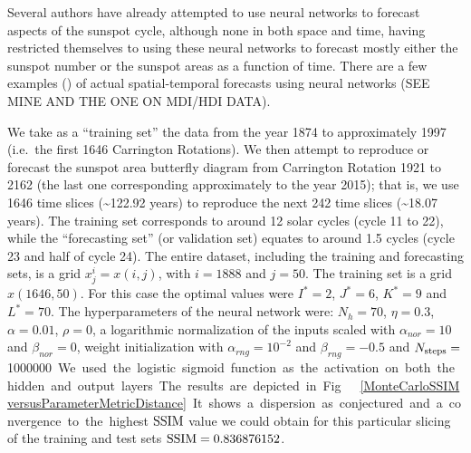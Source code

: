 \documentclass[journal]{IEEEtran}
\begin{document}
Several authors \cite{
1990EOSTr..71..677K,
1991PhDT.......158W,
Weigend92HubermanRumelhart,
1993AdSpR..13..447M,
1995JGR...10021735M,
1994VA.....38..351C,
0305-4470-28-12-012,
1995ApJ...444..916C,
Koskela96timeseries,
1996SoPh..168..423F,
1996AnGeo..14...20F,
1996ITNN....7..501P,
1998GeoRL..25..457K,
1998JGR...10329733C,
1998NewAR..42..343C,
Verdes2000,
2004SoPh..221..167V,
2001GMS...125..201L,
2002PhRvE..66f6701S,
2004SoPh..224..247M,
2005JASTP..67..595G,
2004SPIE.5497..542A ,
2005MmSAI..76.1030Q,
2005SoPh..227..177A,
2006JASTP..68.2061M,
2007SoPh..243..253Q ,
2013Ap&SS.344....5A,
xie2006hybrid,
2006SunGe...1a...8M,
2007IJMPC..18.1839E,
1997SPIE.3077..116P,
2006AGUFMSH21A0315L,
2008cosp...37.3467W,
gang2007sunspot,
2009JASTP..71..569U,
2010BAAA...53..241F,
1999BAAA...43...23P,
2011RAA....11..491A,
2010cosp...38.2153A,
2011CRGeo.343..433C,
JiangS11,
2012cosp...39.1194M,
Chandra:2012:CCE:2181341.2181747,
park2009prediction ,
kim2010sunspot,
moghaddam2013sunspot,
2012EPJP..127...43C,
liu2012sunspot,
Gkana201579,
DBLP:conf/ijcnn/ParsapoorBS15,
DBLP:conf/aaai/ParsapoorBS15,
raios
} have already attempted to use neural networks to forecast aspects of the sunspot cycle, although none in both space and time, having 
restricted themselves to using these neural networks to forecast mostly either the sunspot number or the sunspot areas as a function of 
time.  There are a few examples (\cite{covaspeixinhojoao}) of actual spatial-temporal forecasts using neural networks (SEE MINE AND THE ONE ON 
MDI/HDI DATA).

We take as a ``training set'' the data from the year 1874 to 
approximately 1997 (i.e.\ the first 1646 Carrington Rotations). We then attempt to reproduce or forecast the sunspot area butterfly 
diagram from Carrington Rotation 1921 to 2162 (the last one corresponding approximately to the year 2015); that is, we use 1646 time 
slices (\textasciitilde  122.92 years) to reproduce the next 242 time slices (\textasciitilde  18.07 years). The training set 
corresponds to around 12 solar cycles (cycle 11 to 22), while the ``forecasting set'' (or validation set) equates to around 1.5 cycles 
(cycle 23 and half of cycle 24). The entire dataset, including the training and forecasting sets, is a grid $x^i_j=x(i,j)$, with 
$i=1888$ and $j=50$. The training set is a grid $x(1646,50)$. For this case the optimal values were $I^*=2$, $J^*=6$, $K^*=9$ and 
$L^*=70$. 
The hyperparameters of the neural network were:
$N_h=70$, $\eta=0.3$, $\alpha=0.01$, $\rho=0$, a logarithmic normalization of the inputs scaled
 with $\alpha_{nor} = 10$ and $\beta_{nor} = 0$, weight initialization with $\alpha_{rng} = 10^{-2}$ and $\beta_{rng} = -0.5$ 
 and $N_{\textnormal{steps}}=$\SI{1000000}. We used the logistic sigmoid function as the activation on both the hidden and output layers.
The results are depicted in Fig.\ \ref{MonteCarloSSIMversusParameterMetricDistance}.  It shows a dispersion as conjectured and 
a convergence to the highest $\textnormal{SSIM}$ value we could obtain for this particular slicing of the training and test sets 
$\textnormal{SSIM}= 0.836876152$.
\end{document}
